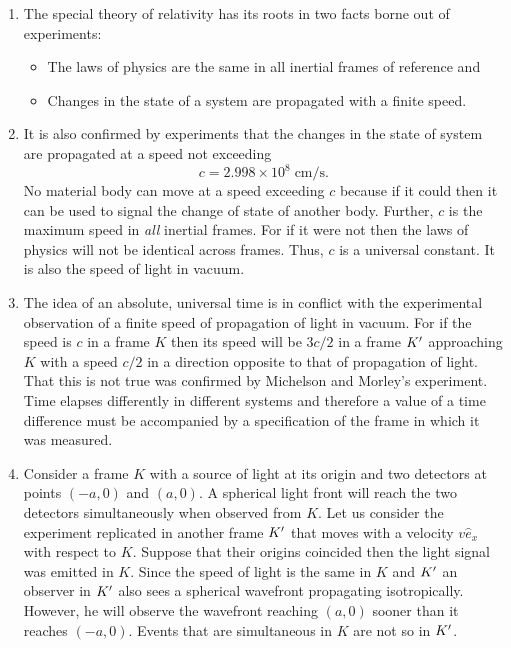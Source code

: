 \begin{enumerate}
\item The special theory of relativity has its roots in two facts borne out 
of experiments:
\begin{itemize}
\item The laws of physics are the same in all inertial frames of reference and
\item Changes in the state of a system are propagated with a finite speed.
\end{itemize}

\item It is also confirmed by experiments that the changes in the state of system 
are propagated at a speed not exceeding
\begin{equation}\label{c1e1}
c = 2.998 \times 10^8 \;\text{cm/s}.
\end{equation}
No material body can move at a speed exceeding $c$ because if it could then it
can be used to signal the change of state of another body. Further, $c$ is the
maximum speed in \emph{all} inertial frames. For if it were not then the laws of
physics will not be identical across frames. Thus, $c$ is a universal constant.
It is also the speed of light in vacuum.

\item The idea of an absolute, universal time is in conflict with the experimental 
observation of a finite speed of propagation of light in vacuum. For if the
speed is $c$ in a frame $K$ then its speed will be $3c/2$ in a frame $K^\prime$
approaching $K$ with a speed $c/2$ in a direction opposite to that of propagation
of light. That this is not true was confirmed by Michelson and Morley's experiment.
Time elapses differently in different systems and therefore a value of a time
difference must be accompanied by a specification of the frame in which it was 
measured.

\item Consider a frame $K$ with a source of light at its origin and two detectors at
points $(-a, 0)$ and $(a, 0)$. A spherical light front will reach the two 
detectors simultaneously when observed from $K$. Let us consider the experiment
replicated in another frame $K^\prime$ that moves with a velocity $v\hat{e}_x$ with
respect to $K$. Suppose that their origins coincided then the light signal was 
emitted in $K$. Since the speed of light is the same in $K$ and $K^\prime$ an observer
in $K^\prime$ also sees a spherical wavefront propagating isotropically. However, he
will observe the wavefront reaching $(a, 0)$ sooner than it reaches $(-a, 0)$.
Events that are simultaneous in $K$ are not so in $K^\prime$.


\end{enumerate}

